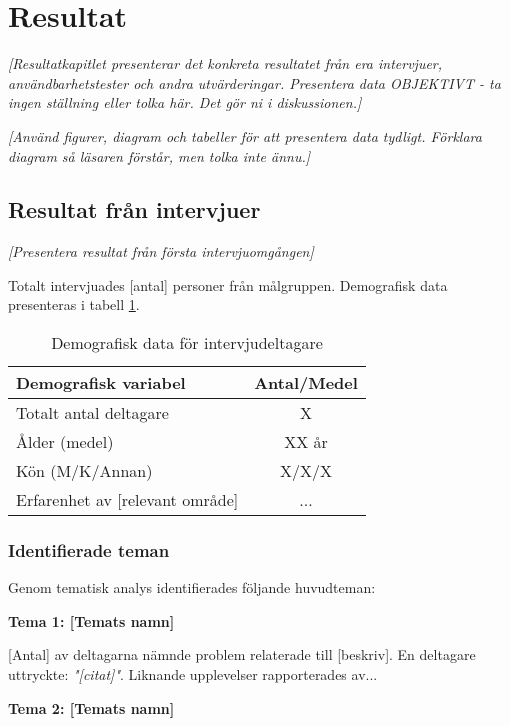 \section{Resultat}
\label{sec:resultat_test}

\textit{[Resultatkapitlet presenterar det konkreta resultatet från era intervjuer, användbarhetstester och andra utvärderingar. Presentera data OBJEKTIVT - ta ingen ställning eller tolka här. Det gör ni i diskussionen.]}

\textit{[Använd figurer, diagram och tabeller för att presentera data tydligt. Förklara diagram så läsaren förstår, men tolka inte ännu.]}


\subsection{Resultat från intervjuer}

\textit{[Presentera resultat från första intervjuomgången]}

Totalt intervjuades [antal] personer från målgruppen. Demografisk data presenteras i tabell \ref{tab:demografi}.

\begin{table}[h]
\centering
\begin{tabular}{|l|c|}
\hline
\textbf{Demografisk variabel} & \textbf{Antal/Medel} \\
\hline
Totalt antal deltagare & X \\
Ålder (medel) & XX år \\
Kön (M/K/Annan) & X/X/X \\
Erfarenhet av [relevant område] & ... \\
\hline
\end{tabular}
\caption{Demografisk data för intervjudeltagare}
\label{tab:demografi}
\end{table}


\subsubsection{Identifierade teman}

Genom tematisk analys identifierades följande huvudteman:

\textbf{Tema 1: [Temats namn]}

[Antal] av deltagarna nämnde problem relaterade till [beskriv]. En deltagare uttryckte: \textit{"[citat]"}. Liknande upplevelser rapporterades av...

\textbf{Tema 2: [Temats namn]}

